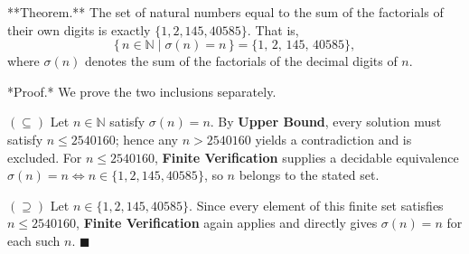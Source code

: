 **Theorem.** The set of natural numbers equal to the sum of the factorials of their own digits is exactly $\{1, 2, 145, 40585\}$. That is,
$$\{\, n \in \mathbb{N} \mid \sigma(n) = n \,\} = \{1,\, 2,\, 145,\, 40585\},$$
where $\sigma(n)$ denotes the sum of the factorials of the decimal digits of $n$.

*Proof.* We prove the two inclusions separately.

$(\subseteq)$ Let $n \in \mathbb{N}$ satisfy $\sigma(n) = n$. By \textbf{Upper Bound}, every solution must satisfy $n \leq 2540160$; hence any $n > 2540160$ yields a contradiction and is excluded. For $n \leq 2540160$, \textbf{Finite Verification} supplies a decidable equivalence $\sigma(n) = n \iff n \in \{1, 2, 145, 40585\}$, so $n$ belongs to the stated set.

$(\supseteq)$ Let $n \in \{1, 2, 145, 40585\}$. Since every element of this finite set satisfies $n \leq 2540160$, \textbf{Finite Verification} again applies and directly gives $\sigma(n) = n$ for each such $n$. $\blacksquare$